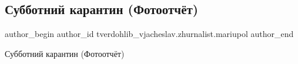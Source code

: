  
 
 
 
 

\subsection{Субботний карантин (Фотоотчёт)}
\label{sec:21_03_2020.fb.tverdohlib_vjacheslav.zhurnalist.mariupol.1.subbotnii_karantin__}

\ifcmt
 author_begin
   author_id tverdohlib_vjacheslav.zhurnalist.mariupol
 author_end
\fi

Субботний карантин (Фотоотчёт)
